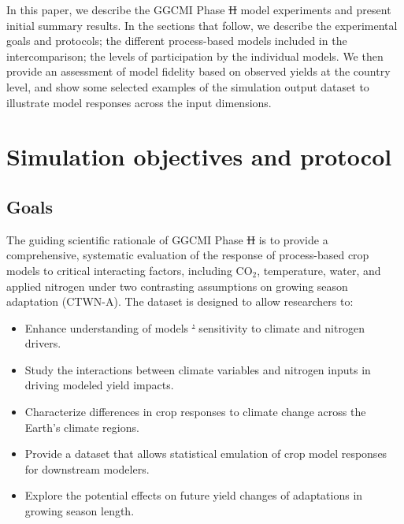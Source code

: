\documentclass[gmd, manuscript]{copernicus} %
\providecommand{\DIFadd}[1]{{\protect\color{blue}\uwave{#1}}} %
\providecommand{\DIFdel}[1]{{\protect\color{red}\sout{#1}}}                      %
\providecommand{\DIFaddbegin}{} %
\providecommand{\DIFaddend}{} %
\providecommand{\DIFdelbegin}{} %
\providecommand{\DIFdelend}{} %
\begin{document}
In this paper, we describe the GGCMI Phase \DIFdelbegin \DIFdel{II }\DIFdelend \DIFaddbegin \DIFadd{2 }\DIFaddend model experiments and present initial summary results.
In the sections that follow, we describe the experimental goals and protocols; the different process-based models included in the intercomparison; the levels of participation by the individual models. We then provide an assessment of model fidelity based on observed yields at the country level, and show some selected examples of the simulation output dataset to illustrate model responses across the input dimensions.

\section{Simulation objectives and protocol}
\label{S:2}
\subsection{Goals}

The guiding scientific rationale of GGCMI Phase \DIFdelbegin \DIFdel{II }\DIFdelend \DIFaddbegin \DIFadd{2 }\DIFaddend is to provide a comprehensive, systematic evaluation of the response of process-based crop models to critical interacting factors, including CO$_2$, temperature, water, and applied nitrogen under two contrasting assumptions on growing season adaptation (CTWN-A). 
The dataset is designed to allow researchers to:
\begin{itemize}
    \item Enhance understanding of models \DIFdelbegin \DIFdel{’ }\DIFdelend sensitivity to climate and nitrogen drivers.
    \item Study the interactions between climate variables and nitrogen inputs in driving modeled yield impacts. 
    \item Characterize differences in crop responses to climate change across the Earth's climate regions.
    \item Provide a dataset that allows statistical emulation of crop model responses for downstream modelers.
    \item Explore the potential effects on future yield changes of adaptations in growing season length.
\end{itemize}
\vspace{-0.05in}
\end{document}
